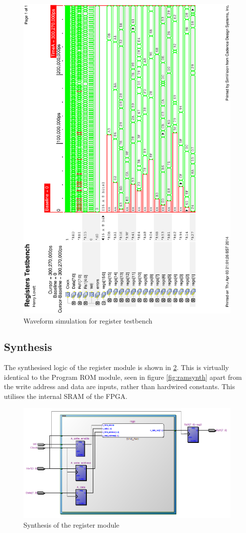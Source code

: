 \begin{figure}
\includegraphics[height=\textheight-1cm]{Figures/registerssim.eps}
\caption{Waveform simulation for register testbench}
\label{fig:regsim}
\end{figure}

\subsection{Synthesis}

The synthesised logic of the register module is shown in \ref{fig:registersynth}.
This is virtually identical to the Program ROM module, seen in figure \ref{fig:ramsynth} apart from the write address and data are inputs, rather than hardwired constants.
This utilises the internal SRAM of the FPGA. 

\begin{figure}
\includegraphics[width=\textwidth]{Figures/registersynth.png}
\caption{Synthesis of the register module}
\label{fig:registersynth}
\end{figure}
